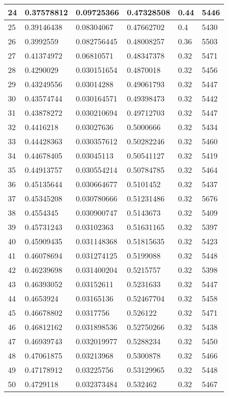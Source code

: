 \begin{longtable}{|l|l|l|l|l|l|}
24 & 0.37578812 & 0.09725366 & 0.47328508 & 0.44 & 5446 \\ \hline 
25 & 0.39146438 & 0.08304067 & 0.47662702 & 0.4 & 5430 \\ \hline 
26 & 0.3992559 & 0.082756445 & 0.48008257 & 0.36 & 5503 \\ \hline 
27 & 0.41374972 & 0.06810571 & 0.48347378 & 0.32 & 5471 \\ \hline 
28 & 0.4290029 & 0.030151654 & 0.4870018 & 0.32 & 5456 \\ \hline 
29 & 0.43249556 & 0.03014288 & 0.49061793 & 0.32 & 5447 \\ \hline 
30 & 0.43574744 & 0.030164571 & 0.49398473 & 0.32 & 5442 \\ \hline 
31 & 0.43878272 & 0.030210694 & 0.49712703 & 0.32 & 5447 \\ \hline 
32 & 0.4416218 & 0.03027636 & 0.5000666 & 0.32 & 5434 \\ \hline 
33 & 0.44428363 & 0.030357612 & 0.50282246 & 0.32 & 5460 \\ \hline 
34 & 0.44678405 & 0.03045113 & 0.50541127 & 0.32 & 5419 \\ \hline 
35 & 0.44913757 & 0.030554214 & 0.50784785 & 0.32 & 5464 \\ \hline 
36 & 0.45135644 & 0.030664677 & 0.5101452 & 0.32 & 5437 \\ \hline 
37 & 0.45345208 & 0.030780666 & 0.51231486 & 0.32 & 5676 \\ \hline 
38 & 0.4554345 & 0.030900747 & 0.5143673 & 0.32 & 5409 \\ \hline 
39 & 0.45731243 & 0.03102363 & 0.51631165 & 0.32 & 5397 \\ \hline 
40 & 0.45909435 & 0.031148368 & 0.51815635 & 0.32 & 5423 \\ \hline 
41 & 0.46078694 & 0.031274125 & 0.5199088 & 0.32 & 5448 \\ \hline 
42 & 0.46239698 & 0.031400204 & 0.5215757 & 0.32 & 5398 \\ \hline 
43 & 0.46393052 & 0.03152611 & 0.5231633 & 0.32 & 5447 \\ \hline 
44 & 0.4653924 & 0.03165136 & 0.52467704 & 0.32 & 5458 \\ \hline 
45 & 0.46678802 & 0.0317756 & 0.526122 & 0.32 & 5471 \\ \hline 
46 & 0.46812162 & 0.031898536 & 0.52750266 & 0.32 & 5438 \\ \hline 
47 & 0.46939743 & 0.032019977 & 0.5288234 & 0.32 & 5450 \\ \hline 
48 & 0.47061875 & 0.03213968 & 0.5300878 & 0.32 & 5466 \\ \hline 
49 & 0.47178912 & 0.03225756 & 0.53129965 & 0.32 & 5448 \\ \hline 
50 & 0.4729118 & 0.032373484 & 0.532462 & 0.32 & 5467 \\ \hline 
\end{longtable}